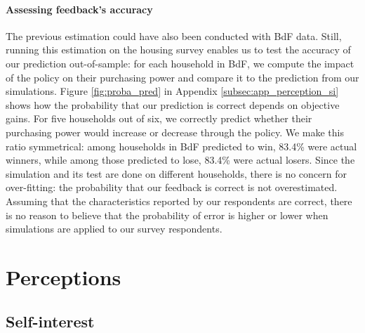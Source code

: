 \documentclass[11pt]{article}
\begin{document}
\paragraph{Assessing feedback's accuracy}
The previous estimation could have also been conducted with BdF data. Still, running this estimation on the housing survey enables us to test the accuracy of our prediction out-of-sample: for each household in BdF, we compute the impact of the policy on their purchasing power and compare it to the prediction from our simulations. Figure \ref{fig:proba_pred} in Appendix \ref{subsec:app_perception_si} shows how the probability that our prediction is correct depends on objective gains. For five households out of six, we correctly predict whether their purchasing power would increase or decrease through the policy. We make this ratio symmetrical: among households in BdF predicted to win, 83.4\% were actual winners, while among those predicted to lose, 83.4\% were actual losers. Since the simulation and its test are done on different households, there is no concern for over-fitting: the probability that our feedback is correct is not overestimated. Assuming that the characteristics reported by our respondents are correct, there is no reason to believe that the probability of error is higher or lower when simulations are applied to our survey respondents.


\section{Perceptions}\label{sec:perceptions}

    \subsection{Self-interest}\label{subsec:perc_si}
\end{document}
